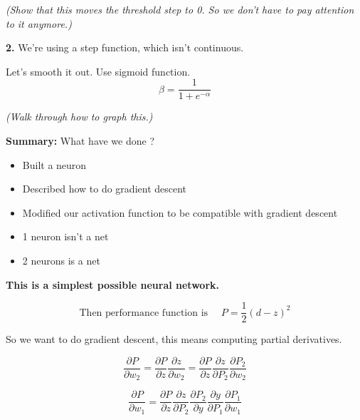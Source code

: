 \textit{(Show that this moves the threshold step to 0.  So we don't
  have to pay attention to it anymore.)}

\textbf{\large 2. } We're using a step function, which isn't continuous.

Let's smooth it out.  Use sigmoid function.
\begin{displaymath}
  \beta = \frac{1}{1+e^{-\alpha}}
\end{displaymath}

\textit{(Walk through how to graph this.)}

\textbf{Summary: } What have we done ?
\begin{itemize}
\item Built a neuron
\item Described how to do gradient descent
\item Modified our activation function to be compatible with gradient descent
\end{itemize}


\begin{itemize}
\item 1 neuron isn't a net
\item 2 neurons is a  net
\end{itemize}

\textbf{This is a simplest possible neural network.}



\begin{displaymath}
  \mbox{Then performance function is } \quad  P = \frac{1}{2} (d-z)^2
\end{displaymath}

So we want to do gradient descent, this means computing partial derivatives.

\begin{displaymath}
  \frac{\partial P}{\partial w_2}
  =
  \frac{\partial P}{\partial z}
  \frac{\partial z}{\partial w_2}
  =
  \frac{\partial P}{\partial z}
  \frac{\partial z}{\partial P_2}
  \frac{\partial P_2}{\partial w_2}
\end{displaymath}

\begin{displaymath}
  \frac{\partial P}{\partial w_1}
  =
  \frac{\partial P}{\partial z}
  \frac{\partial z}{\partial P_2}
  \frac{\partial P_2}{\partial y}
  \frac{\partial y}{\partial P_1}
  \frac{\partial P_1}{\partial w_1}
\end{displaymath}

